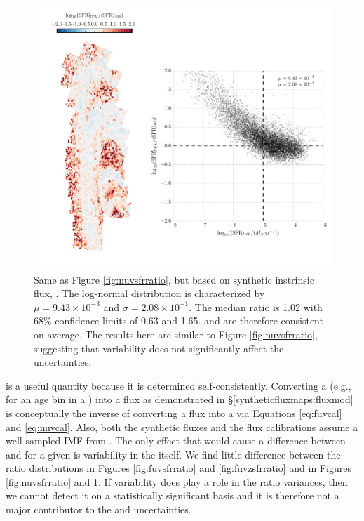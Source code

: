 \documentclass[iop, tighten]{emulateapj}
\begin{document}
\begin{figure}
\centering
\includegraphics[width=\textwidth]{m31flux-figures/sfr_nuv0-vs-mean.pdf}
\caption[Ratio of the \sfr{} based on the synthetic intrinsic \nuv{} flux to
the $100\myr$ mean \sfr{}.]{Same as Figure \ref{fig:nuvsfrratio}, but based on
    synthetic instrinsic flux, \sfrnuvz{}. The log-normal distribution is
    characterized by $\mu = 9.43\times 10^{-3}$ and $\sigma = 2.08\times
    10^{-1}$. The median ratio is 1.02 with 68\% confidence limits of 0.63 and
    1.65. \sfrnuvz{} and \sfroneh{} are therefore consistent on average. The
    results here are similar to Figure \ref{fig:nuvsfrratio}, suggesting that
    \sfh{} variability does not significantly affect the \sfrnuv{}
    uncertainties.
}
\label{fig:nuvzsfrratio}
\end{figure}


\sfrxz{} is a useful quantity because it is determined self-consistently.
Converting a \sfr{} (e.g., for an age bin in a \sfh{}) into a flux as
demonstrated in \S \ref{syntheticfluxmaps:fluxmod} is conceptually the inverse
of converting a flux into a \sfr{} via Equations \ref{eq:fuvcal} and
\ref{eq:nuvcal}. Also, both the synthetic fluxes and the flux calibrations
assume a well-sampled IMF from \citet{Kroupa:2001}. The only effect that would
cause a difference between \sfroneh{} and \sfrxz{} for a given \sfh{} is
variability in the \sfh{} itself. We find little difference between the \sfr{}
ratio distributions in Figures \ref{fig:fuvsfrratio} and \ref{fig:fuvzsfrratio}
and in Figures \ref{fig:nuvsfrratio} and \ref{fig:nuvzsfrratio}. If \sfh{}
variability does play a role in the \sfr{} ratio variances, then we cannot
detect it on a statistically significant basis and it is therefore not a major
contributor to the \sfrx{} and \sfrxz{} uncertainties.
\end{document}
